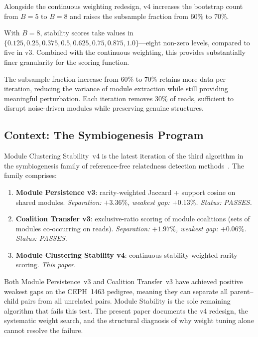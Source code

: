 \documentclass{../yalumba}
\begin{document}
Alongside the continuous weighting redesign, v4 increases the bootstrap count
from $B = 5$ to $B = 8$ and raises the subsample fraction from 60\% to 70\%.


With $B = 8$, stability scores take values in $\{0.125, 0.25, 0.375, 0.5,
0.625, 0.75, 0.875, 1.0\}$---eight non-zero levels, compared to five in v3.
Combined with the continuous weighting, this provides substantially finer
granularity for the scoring function.

The subsample fraction increase from 60\% to 70\% retains more data per
iteration, reducing the variance of module extraction while still providing
meaningful perturbation.  Each iteration removes 30\% of reads, sufficient to
disrupt noise-driven modules while preserving genuine structures.

\subsection{Context: The Symbiogenesis Program}

Module Clustering Stability~v4 is the latest iteration of the third algorithm
in the symbiogenesis family of reference-free relatedness detection
methods~\cite{margulis1998}.  The family comprises:

\begin{enumerate}
  \item \textbf{Module Persistence v3}: rarity-weighted Jaccard + support cosine
    on shared modules.  \emph{Separation: $+3.36\%$, weakest gap: $+0.13\%$.
    Status: PASSES.}
  \item \textbf{Coalition Transfer v3}: exclusive-ratio scoring of module
    coalitions (sets of modules co-occurring on reads).
    \emph{Separation: $+1.97\%$, weakest gap: $+0.06\%$. Status: PASSES.}
  \item \textbf{Module Clustering Stability v4}: continuous stability-weighted
    rarity scoring.  \emph{This paper.}
\end{enumerate}

Both Module Persistence~v3 and Coalition Transfer~v3 have achieved positive
weakest gaps on the CEPH~1463 pedigree, meaning they can separate all
parent--child pairs from all unrelated pairs.  Module Stability is the sole
remaining algorithm that fails this test.  The present paper documents the v4
redesign, the systematic weight search, and the structural diagnosis of why
weight tuning alone cannot resolve the failure.
\end{document}

